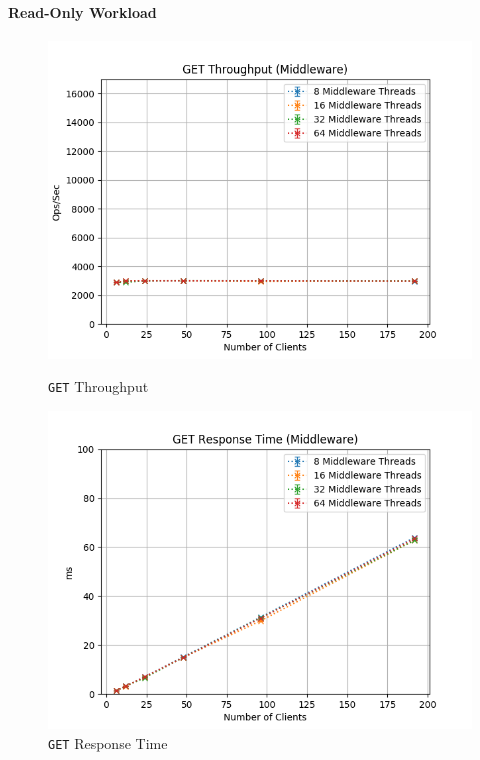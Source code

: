 \documentclass[11pt,a4paper]{article}
\begin{document}
\paragraph{Read-Only Workload}
%
\begin{figure}[H]
	\centering
    \begin{minipage}{0.5\textwidth}
        \centering
        \includegraphics[width=\textwidth]{../illustrations/plots/2_1_one_middleware/0-1/middleware_get_tp_s.png}
        \caption{\texttt{GET} Throughput}
        \label{fig:one_middleware_get_tp_mw}
    \end{minipage}\hfill
    \begin{minipage}{0.5\textwidth}
        \centering
        \includegraphics[width=\textwidth]{../illustrations/plots/2_1_one_middleware/0-1/middleware_get_rt_ms.png}
        \caption{\texttt{GET} Response Time}
        \label{fig:one_middleware_get_rt_mw}
    \end{minipage}
\end{figure}
\end{document}
